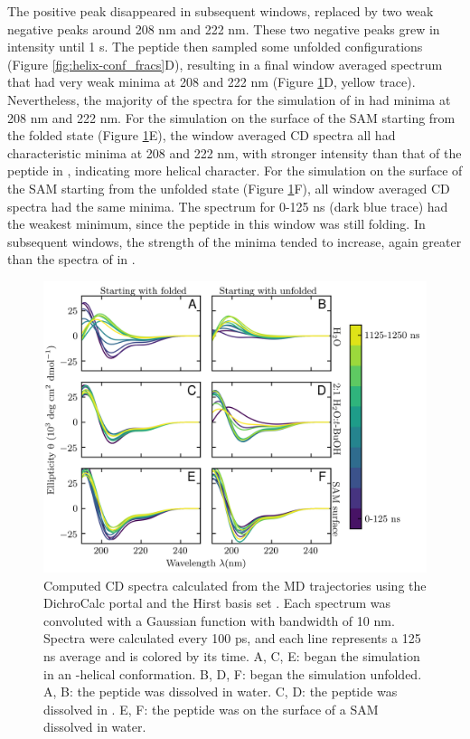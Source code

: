 The positive peak disappeared in subsequent windows, replaced by two weak negative peaks around 208 nm and 222 nm. 
These two negative peaks grew in intensity until 1 \textmu{}s. 
The peptide then sampled some unfolded configurations (Figure \ref{fig:helix-conf_fracs}D), resulting in a final window averaged spectrum that had very weak minima at 208 and 222 nm (Figure \ref{fig:helix-calc_cd}D, yellow trace). 
Nevertheless, the majority of the spectra for the simulation of \pep{} in \tbawat{} had minima at 208 nm and 222 nm. 
For the simulation on the surface of the SAM starting from the folded state (Figure \ref{fig:helix-calc_cd}E), the window averaged CD spectra all had characteristic minima at 208 and 222 nm, with stronger intensity than that of the peptide in \tbawat{}, indicating more helical character. 
For the simulation on the surface of the SAM starting from the unfolded state (Figure \ref{fig:helix-calc_cd}F), all window averaged CD spectra had the same minima. 
The spectrum for 0-125 ns (dark blue trace) had the weakest minimum, since the peptide in this window was still folding. 
In subsequent windows, the strength of the minima tended to increase, again greater than the spectra of \pep{} in \tbawat{}.

\begin{figure}
    \center
    \includegraphics[width=6.0in]{figures-helix/cd_spectra_hirst_time_resolved.png}
    \caption{
        Computed CD spectra calculated from the MD trajectories using the DichroCalc portal and the Hirst basis set \cite{Hirst1998, Besley1999}.
        Each spectrum was convoluted with a Gaussian function with bandwidth of 10 nm. 
        Spectra were calculated every 100 ps, and each line represents a 125 ns average and is colored by its time. 
        A, C, E: \pep{} began the simulation in an \textalpha{}-helical conformation. 
        B, D, F: \pep{} began the simulation unfolded. 
        A, B: the peptide was dissolved in water. 
        C, D: the peptide was dissolved in \tbawat{}. 
        E, F: the peptide was on the surface of a SAM dissolved in water.
    }
    \label{fig:helix-calc_cd}
\end{figure}

